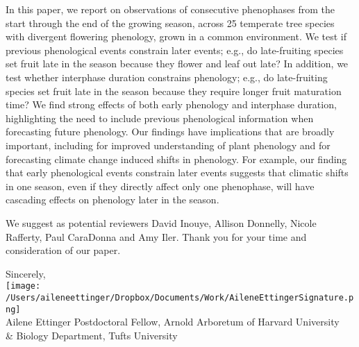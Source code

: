 \documentclass[10.95pt,a4paper]{letter}
\begin{document}
\begin{letter}{}
In this paper, we report on observations of consecutive phenophases from the start through the end of the growing season, across 25 temperate tree species with divergent flowering phenology, grown in a common environment. We test if previous phenological events constrain later events; e.g., do late-fruiting species set fruit late in the season because they flower and leaf out late? In addition, we test whether interphase duration constrains phenology; e.g., do late-fruiting species set fruit late in the season because they require longer fruit maturation time? We find strong effects of both early phenology and interphase duration, highlighting the need to include previous phenological information when forecasting future phenology. Our findings have implications that are broadly important, including  for improved understanding of plant phenology and for forecasting climate change induced shifts in phenology. For example, our finding that early phenological events constrain later events suggests that climatic shifts in one season, even if they directly affect only one phenophase, will have cascading effects on phenology later in the season. 

We suggest as potential reviewers David Inouye, Allison Donnelly, Nicole Rafferty, Paul CaraDonna and Amy Iler. Thank you for your time and consideration of our paper. 


Sincerely,\\

\texttt{[image: /Users/aileneettinger/Dropbox/Documents/Work/AileneEttingerSignature.png]} \\
Ailene Ettinger
Postdoctoral Fellow, Arnold Arboretum of Harvard University \\ \& Biology Department, Tufts University


\clearpage



\end{letter}
\end{document}
